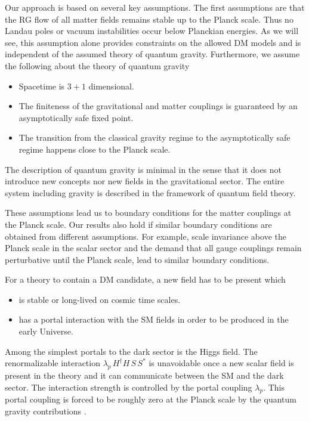 \documentclass[aps,prd,twocolumn,preprintnumbers,superscriptaddress,nobibnotes,floatfix,longbibliography]{revtex4-1}
\begin{document}
Our approach is based on several key assumptions. The first assumptions are that the RG flow of all matter fields remains stable up to the Planck scale. Thus no Landau poles or vacuum instabilities occur below Planckian energies. As we will see, this assumption alone provides constraints on the allowed DM models and is independent of the assumed theory of quantum gravity.  Furthermore, we assume the following about the theory of quantum gravity
\begin{itemize}
\item Spacetime is $3+1$ dimensional.
\item The finiteness of the gravitational and matter couplings is guaranteed by an asymptotically safe fixed point. 
\item The transition from the classical gravity regime to the asymptotically safe regime happens close to the Planck scale.
\end{itemize}
The description of quantum gravity is minimal in the sense that it does not introduce new concepts nor new fields in the gravitational sector. The entire system including gravity is described in the framework of quantum field theory. 

These assumptions lead us to boundary conditions for the matter couplings at the Planck scale.
Our results also hold if similar boundary conditions are obtained from different assumptions.
For example, scale invariance above the Planck scale in the scalar sector and the demand that all gauge couplings remain perturbative until the Planck scale, lead to similar boundary conditions.  

For a theory to contain a DM candidate, a new field has to be present which 
\begin{itemize}
\item is stable or long-lived on cosmic time scales.
\item has a portal interaction with the SM fields in order to be produced in the early Universe.
\end{itemize}
Among the simplest portals to the dark sector is the Higgs field. The renormalizable interaction $ \lambda_p \,H^\dagger H\, S\,S^*$ is unavoidable once a new scalar field is present in the theory and it can communicate between the SM and the dark sector. The interaction strength is controlled by the portal coupling $\lambda_p$. This portal coupling is forced to be roughly zero at the Planck scale by the quantum gravity contributions \cite{Eichhorn:2017als,Pawlowski:2018ixd}.
\end{document}
